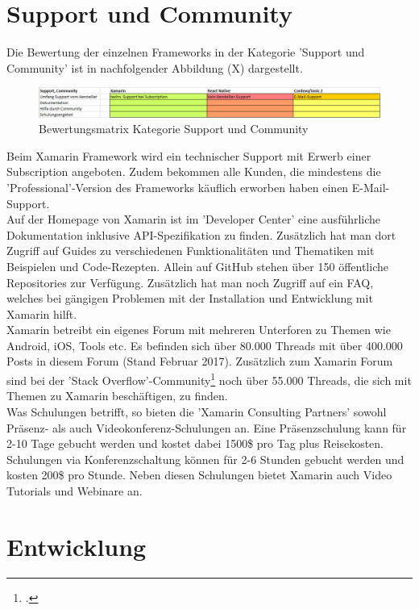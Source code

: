 \section{Support und Community}

Die Bewertung der einzelnen Frameworks in der Kategorie 'Support und Community' ist in nachfolgender Abbildung (X) dargestellt.

\begin{figure}[h]
	\centering
	\includegraphics[width=1\textwidth]{Bilder/Auswertung_SupportCommunity.PNG}
	\caption{Bewertungsmatrix Kategorie Support und Community}
	\label{fig:AuswEntw}
\end{figure}

Beim Xamarin Framework wird ein technischer Support mit Erwerb einer Subscription angeboten. Zudem bekommen alle Kunden, die mindestens die 'Professional'-Version des Frameworks käuflich erworben haben einen E-Mail-Support. 
\\
Auf der Homepage von Xamarin ist im 'Developer Center' eine ausführliche Dokumentation inklusive API-Spezifikation zu finden. Zusätzlich hat man dort Zugriff auf Guides zu verschiedenen Funktionalitäten und Thematiken mit Beispielen und Code-Rezepten. Allein auf GitHub stehen über 150 öffentliche Repositories zur Verfügung. Zusätzlich hat man noch Zugriff auf ein FAQ, welches bei gängigen Problemen mit der Installation und Entwicklung mit Xamarin hilft. 
\\
Xamarin betreibt ein eigenes Forum mit mehreren Unterforen zu Themen wie Android, iOS, Tools etc. Es befinden sich über 80.000 Threads mit über 400.000 Posts in diesem Forum (Stand Februar 2017). Zusätzlich zum Xamarin Forum sind bei der 'Stack Overflow'-Community\footcite{StackOverfolw} noch über 55.000 Threads, die sich mit Themen zu Xamarin beschäftigen, zu finden. 
\\
Was Schulungen betrifft, so bieten die 'Xamarin Consulting Partners' sowohl Präsenz- als auch Videokonferenz-Schulungen an. Eine Präsenzschulung kann für 2-10 Tage gebucht werden und kostet dabei 1500\$ pro Tag plus Reisekosten. Schulungen via Konferenzschaltung können für 2-6 Stunden gebucht werden und kosten 200\$ pro Stunde. Neben diesen Schulungen bietet Xamarin auch Video Tutorials und Webinare an. 

\section{Entwicklung}


